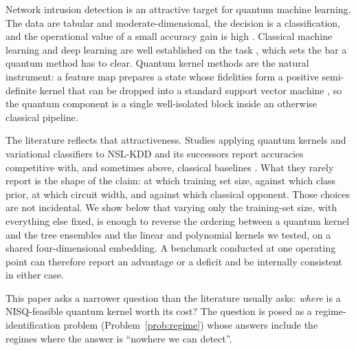 %
%

\begin{revbody}
Network intrusion detection is an attractive target for quantum machine
learning. The data are tabular and moderate-dimensional, the decision is a
classification, and the operational value of a small accuracy gain is high
\cite{ref24}. Classical machine learning and deep learning are well established
on the task \cite{ref1,ref2,ref3}, which sets the bar a quantum method has to
clear. Quantum kernel methods are the natural instrument: a feature map prepares a
state whose fidelities form a positive semi-definite kernel that can be dropped
into a standard support vector machine \cite{havlicek2019,schuld2019}, so the
quantum component is a single well-isolated block inside an otherwise classical
pipeline.

The literature reflects that attractiveness. Studies applying quantum kernels
and variational classifiers to NSL-KDD \cite{ref4} and its successors
\cite{ref25} report accuracies competitive with, and sometimes above,
classical baselines \cite{ref13,ref14,ref15}. What they rarely report is the shape of the claim: at which training
set size, against which class prior, at which circuit width, and against which
classical opponent. Those choices are not incidental. We show below that varying
only the training-set size, with everything else fixed, is enough to reverse the
ordering between a quantum kernel and the tree ensembles and the linear and
polynomial kernels we tested, on a shared four-dimensional embedding.
A benchmark conducted at one operating point can therefore report an advantage
or a deficit and be internally consistent in either case.

This paper asks a narrower question than the literature usually asks:
\emph{where} is a NISQ-feasible quantum kernel worth its cost? The question is
posed as a regime-identification problem (Problem~\ref{prob:regime}) whose
answers include the regimes where the answer is ``nowhere we can detect''.


\end{revbody}
